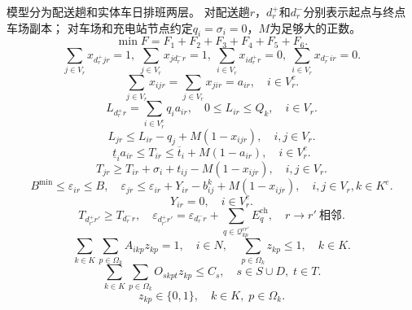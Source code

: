 \documentclass{setp-new}
\begin{document}
模型分为配送趟和实体车日排班两层。
对配送趟$r$，$d_r^+$和$d_r^-$分别表示起点与终点车场副本；
对车场和充电站节点约定$q_i=\sigma_i=0$，$M$为足够大的正数。
\begin{equation}
\min F=F_1+F_2+F_3+F_4+F_5+F_6. \label{eq:obj}
\end{equation}
\begin{equation}
\sum_{j\in V_r}x_{d_r^+jr}=1,\ \sum_{j\in V_r}x_{jd_r^-r}=1,\ \sum_{i\in V_r}x_{id_r^+r}=0,\ \sum_{i\in V_r}x_{d_r^-ir}=0.
\label{eq:trip_flow}
\end{equation}
\begin{equation}
\sum_{j\in V_r}x_{ijr}=\sum_{j\in V_r}x_{jir}=a_{ir},\quad i\in V_r^c.
\label{eq:flow_cons}
\end{equation}
\begin{equation}
L_{d_r^+r}=\sum_{i\in V_r^c}q_i a_{ir},\quad 0\le L_{ir}\le Q_k,\quad i\in V_r.
\label{eq:load_bounds}
\end{equation}
\begin{equation}
L_{jr}\le L_{ir}-q_j+M(1-x_{ijr}),\quad i,j\in V_r.
\label{eq:load_prop}
\end{equation}
\begin{equation}
\underline t_i a_{ir}\le T_{ir}\le\overline t_i+M(1-a_{ir}),\quad i\in V_r^c.
\label{eq:tw}
\end{equation}
\begin{equation}
T_{jr}\ge T_{ir}+\sigma_i+t_{ij}-M(1-x_{ijr}),\quad i,j\in V_r.
\label{eq:time_prop}
\end{equation}
\begin{equation}
B^{\min}\le\varepsilon_{ir}\le B,\quad
\varepsilon_{jr}\le\varepsilon_{ir}+Y_{ir}-b_{ij}^k+M(1-x_{ijr}),\quad
i,j\in V_r, k\in K^e.
\label{eq:batt_prop}
\end{equation}
\begin{equation}
Y_{ir}=0,\quad i\in V_r^c.
\label{eq:no_customer_charge}
\end{equation}
\begin{equation}
T_{d_{r'}^+r'}\ge T_{d_r^-r},\quad
\varepsilon_{d_{r'}^+r'}=\varepsilon_{d_r^-r}+\sum_{q\in\mathcal Q_{kp}^{rr'}}E_q^{\mathrm{ch}},\quad r\to r'\ \text{相邻}.
\label{eq:trip_linkage}
\end{equation}
\begin{equation}
\sum_{k\in K}\sum_{p\in\Omega_k}A_{ikp}z_{kp}=1,\quad i\in N,\quad
\sum_{p\in\Omega_k}z_{kp}\le1,\quad k\in K.
\label{eq:coverage}
\end{equation}
\begin{equation}
\sum_{k\in K}\sum_{p\in\Omega_k}O_{skpt}z_{kp}\le C_s,\quad s\in S\cup D,\;t\in T.
\label{eq:station_cap}
\end{equation}
\begin{equation}
z_{kp}\in\{0,1\},\quad k\in K,\;p\in\Omega_k.
\label{eq:binary}
\end{equation}
\end{document}
